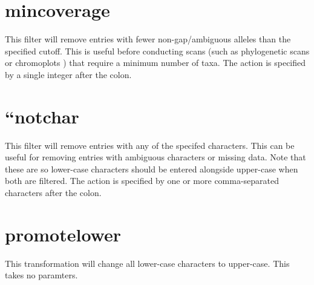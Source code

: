 \documentclass[letterpaper,11pt,english]{sphinxmanual}
\begin{document}
\section{mincoverage}
\label{\detokenize{mvf_filter_modules:mincoverage}}
This filter will remove entries with fewer non-gap/ambiguous alleles
than the specified cutoff. This is useful before conducting scans
(such as phylogenetic scans or chromoplots ) that require a minimum
number of taxa.  The action is specified by a single integer after
the colon.

\begin{sphinxVerbatim}[commandchars=\\\{\}]
  
 
 
\end{sphinxVerbatim}


\section{“notchar}
\label{\detokenize{mvf_filter_modules:notchar}}
This filter will remove entries with any of the specifed characters.
This can be useful for removing entries with ambiguous characters
or missing data.  Note that these are  so lower-case
characters should be entered alongside upper-case when both are
filtered.  The action is specified by one or more comma-separated
characters after the colon.

\begin{sphinxVerbatim}[commandchars=\\\{\}]
  
 
 
\end{sphinxVerbatim}


\section{promotelower}
\label{\detokenize{mvf_filter_modules:promotelower}}
This transformation will change all lower-case characters to upper-case.
This takes no paramters.
\end{document}
